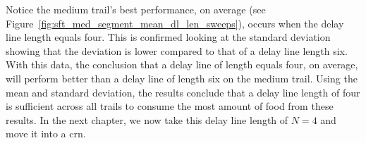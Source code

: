 Notice the medium trail's best performance, on average (see Figure~\ref{fig:sft_med_segment_mean_dl_len_sweeps}), occurs when the delay line length equals four. This is confirmed looking at the standard deviation showing that the deviation is lower compared to that of a delay line length six. With this data, the conclusion that a delay line of length equals four, on average, will perform better than a delay line of length six on the medium trail. Using the mean and standard deviation, the results conclude that a delay line length of four is sufficient across all trails to consume the most amount of food from these results. In the next chapter, we now take this delay line length of $N=4$ and move it into a \gls{crn}.
